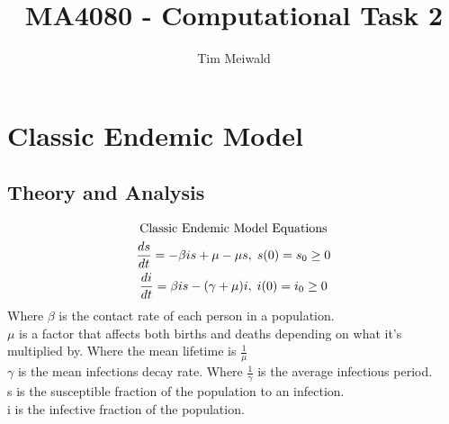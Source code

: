 \documentclass[11pt,a4paper]{CLabBookTemplate} %
\author{Tim Meiwald}
\title{MA4080 - Computational Task 2 } %
\begin{document}
\setcounter{page}{1} %

\maketitle %




\thispagestyle{fancy} %
\mytableofcontents
\newpage %


\setcounter{page}{1} %

\section{Classic Endemic Model}
\subsection{Theory and Analysis}
\begin{gather}
	\textrm{Classic Endemic Model Equations} \notag \\	
	\label{Eq:CEM1}
	\frac{ds}{dt} = -\beta is + \mu - \mu s, \; s(0) = s_{0} \geq 0 \\
	\label{Eq:CEM2}
	\frac{di}{dt} = \beta is - (\gamma + \mu)i, \; i(0) = i_{0} \geq 0
\end{gather}
Where $\beta$ is the contact rate of each person in a population.\\
$\mu$ is a factor that affects both births and deaths depending on what it's multiplied by. Where the mean lifetime is $\frac{1}{\mu}$\\
$\gamma$ is the mean infections decay rate. Where $\frac{1}{\gamma}$ is the average infectious period.\\
s is the susceptible fraction of the population to an infection. \\
i is the infective fraction of the population. \\

\bigskip
\end{document}
